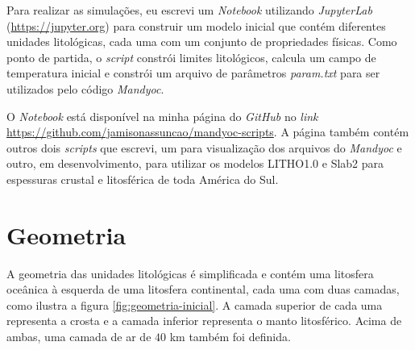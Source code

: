 

%  

Para realizar as simulações, eu escrevi um \textit{Notebook} utilizando \textit{JupyterLab} (\url{https://jupyter.org}) para construir um modelo inicial que contém diferentes unidades litológicas, cada uma com um conjunto de propriedades físicas. Como ponto de partida, o \textit{script} constrói limites litológicos, calcula um campo de temperatura inicial e constrói um arquivo de parâmetros \textit{param.txt} para ser utilizados pelo código \textit{Mandyoc}.

O \textit{Notebook} está disponível na minha página do \textit{GitHub} no \textit{link} \url{https://github.com/jamisonassuncao/mandyoc-scripts}. A página também contém outros dois \textit{scripts} que escrevi, um para visualização dos arquivos do \textit{Mandyoc} e outro, em desenvolvimento, para utilizar os modelos LITHO1.0 \citep{pasyanos2014litho1} e Slab2 \citep{hayes2018slab2} para espessuras crustal e litosférica de toda América do Sul.


\section{Geometria}

A geometria das unidades litológicas é simplificada e contém uma litosfera oceânica à esquerda de uma litosfera continental, cada uma com duas camadas, como ilustra a figura \ref{fig:geometria-inicial}. A camada superior de cada uma representa a crosta e a camada inferior representa o manto litosférico. Acima de ambas, uma camada de ar de $40$ km também foi definida.

